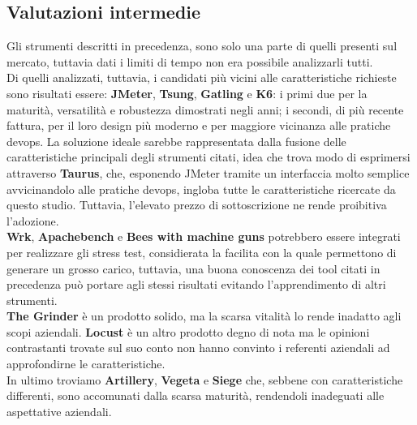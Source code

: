 \subsection{Valutazioni intermedie}
Gli strumenti descritti in precedenza, sono solo una parte di quelli presenti sul mercato, tuttavia dati i limiti di tempo non era possibile analizzarli tutti. \\
Di quelli analizzati, tuttavia, i candidati più vicini alle caratteristiche richieste sono risultati essere: \textbf{JMeter}, \textbf{Tsung}, \textbf{Gatling} e \textbf{K6}: i primi due per la maturità, versatilità e robustezza dimostrati negli anni; i secondi, di più recente fattura, per il loro design più moderno e per maggiore vicinanza alle pratiche \gls{devops}.
La soluzione ideale sarebbe rappresentata dalla fusione delle caratteristiche principali degli strumenti citati, idea che trova modo di esprimersi attraverso \textbf{Taurus}, che, esponendo JMeter tramite un interfaccia molto semplice avvicinandolo alle pratiche \gls{devops}, ingloba tutte le caratteristiche ricercate da questo studio. Tuttavia, l'elevato prezzo di sottoscrizione ne rende proibitiva l'adozione. \\
\textbf{Wrk}, \textbf{Apachebench} e \textbf{Bees with machine guns} potrebbero essere integrati per realizzare gli stress test, considierata la facilita con la quale permettono di generare un grosso carico, tuttavia, una buona conoscenza dei tool citati in precedenza può portare agli stessi risultati evitando l'apprendimento di altri strumenti. \\
\textbf{The Grinder} è un prodotto solido, ma la scarsa vitalità lo rende inadatto agli scopi aziendali.
\textbf{Locust} è un altro prodotto degno di nota ma le opinioni contrastanti trovate sul suo conto non hanno convinto i referenti aziendali ad approfondirne le caratteristiche. \\
In ultimo troviamo \textbf{Artillery}, \textbf{Vegeta} e \textbf{Siege} che, sebbene con caratteristiche differenti, sono accomunati dalla scarsa maturità, rendendoli inadeguati alle aspettative aziendali.
